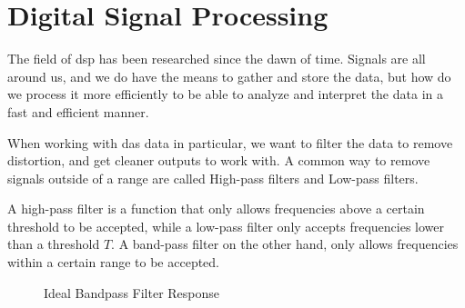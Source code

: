 \section{Digital Signal Processing}
\label{back:dsp}

The field of \acrfull{dsp} has been researched since the dawn of time. Signals are all around us, and we do have the means to gather and store the data, but how do we process it more efficiently to be able to analyze and interpret the data in a fast and efficient manner.

When working with \acrshort{das} data in particular, we want to filter the data to remove distortion, and get cleaner outputs to work with. A common way to remove signals outside of a range are called High-pass filters and Low-pass filters. 

A high-pass filter is a function that only allows frequencies above a certain threshold to be accepted, while a low-pass filter only accepts frequencies lower than a threshold $T$. A band-pass filter on the other hand, only allows frequencies within a certain range to be accepted.

\begin{figure}[h]
\centering
{}
\caption{Ideal Bandpass Filter Response}
\end{figure}


